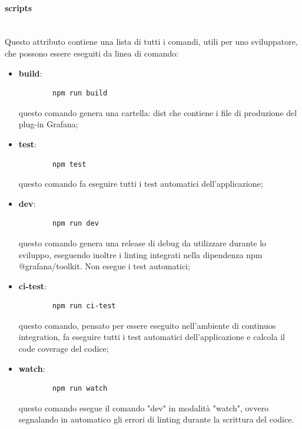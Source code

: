 \paragraph{scripts}\mbox{}\\ [1mm]
Questo attributo contiene una lista di tutti i comandi, utili per uno sviluppatore, che possono essere eseguiti da linea di comando:
\begin{itemize}
	\item \textbf{build}: 
	\begin{verbatim}
		npm run build
	\end{verbatim}
	questo comando genera una cartella: dist che contiene i file di produzione del plug-in Grafana\glo;
	\item \textbf{test}: 
	\begin{verbatim}
		npm test
	\end{verbatim}
	questo comando fa eseguire tutti i test automatici dell'applicazione;
	\item \textbf{dev}: 
	\begin{verbatim}
		npm run dev
	\end{verbatim}
	questo comando genera una release di debug da utilizzare durante lo sviluppo, eseguendo inoltre i linting integrati nella dipendenza npm @grafana/toolkit. Non esegue i test automatici;
	\item \textbf{ci-test}:
	\begin{verbatim}
		npm run ci-test
	\end{verbatim}
	questo comando, pensato per essere eseguito nell'ambiente di continuos integration, fa eseguire tutti i test automatici dell'applicazione e calcola il code coverage del codice;
	\item \textbf{watch}: 
	\begin{verbatim}
		npm run watch
	\end{verbatim}
	questo comando esegue il comando "dev" in modalità "watch", ovvero segnalando in automatico gli errori di linting durante la scrittura del codice.
\end{itemize}
